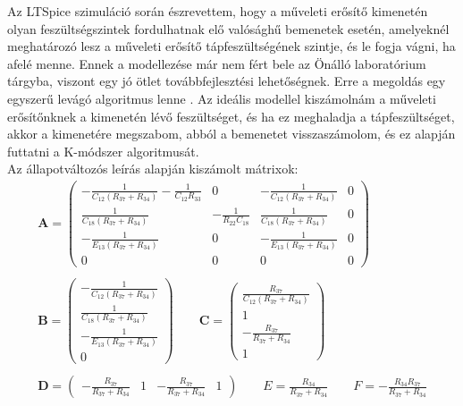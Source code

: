 Az LTSpice szimuláció során észrevettem, hogy a műveleti erősítő kimenetén olyan feszültségszintek fordulhatnak elő valósághű bemenetek esetén, amelyeknél meghatározó lesz a műveleti erősítő tápfeszültségének szintje, és le fogja vágni, ha afelé menne. Ennek a modellezése már nem fért bele az Önálló laboratórium tárgyba, viszont egy jó ötlet továbbfejlesztési lehetőségnek. Erre a megoldás egy egyszerű levágó algoritmus lenne \cite{opampo} \cite{opamp}. Az ideális modellel kiszámolnám a műveleti erősítőnknek a kimenetén lévő feszültséget, és ha ez meghaladja a tápfeszültséget, akkor a kimenetére megszabom, abból a bemenetet visszaszámolom, és ez alapján futtatni a K-módszer algoritmusát.\\
Az állapotváltozós leírás alapján kiszámolt mátrixok:
\begin{equation}
    \begin{array}{c}
        \mathbf{A}=
        \begin{pmatrix}
            -\frac{1}{C_{12}(R_{37}+R_{34})}-\frac{1}{C_{12}R_{33}} & 0 & -\frac{1}{C_{12}(R_{37}+R_{34})} & 0 \\
            \frac{1}{C_{18}(R_{37}+R_{34})} & -\frac{1}{R_{22}C_{18}} & \frac{1}{C_{18}(R_{37}+R_{34})} & 0 \\
            -\frac{1}{E_{13}(R_{37}+R_{34})} & 0 & -\frac{1}{E_{13}(R_{37}+R_{34})} & 0 \\
            0 & 0 & 0 & 0
        \end{pmatrix} \\ \\
        \mathbf{B}=
        \begin{pmatrix}
            -\frac{1}{C_{12}(R_{37}+R_{34})} \\
            \frac{1}{C_{18}(R_{37}+R_{34})} \\
            -\frac{1}{E_{13}(R_{37}+R_{34})} \\
            0
        \end{pmatrix} \qquad
        \mathbf{C}=
        \begin{pmatrix}
            \frac{R_{37}}{C_{12}(R_{37}+R_{34})} \\
            1 \\
            -\frac{R_{37}}{R_{37}+R_{34}} \\
            1
        \end{pmatrix} \\ \\
        \mathbf{D}=
        \begin{pmatrix}
            -\frac{R_{37}}{R_{37}+R_{34}} & 1 & -\frac{R_{37}}{R_{37}+R_{34}} & 1 
        \end{pmatrix} \qquad
        E=\frac{R_{34}}{R_{37}+R_{34}} \qquad
        F=-\frac{R_{34}R_{37}}{R_{37}+R_{34}}
    \end{array}
\end{equation}

